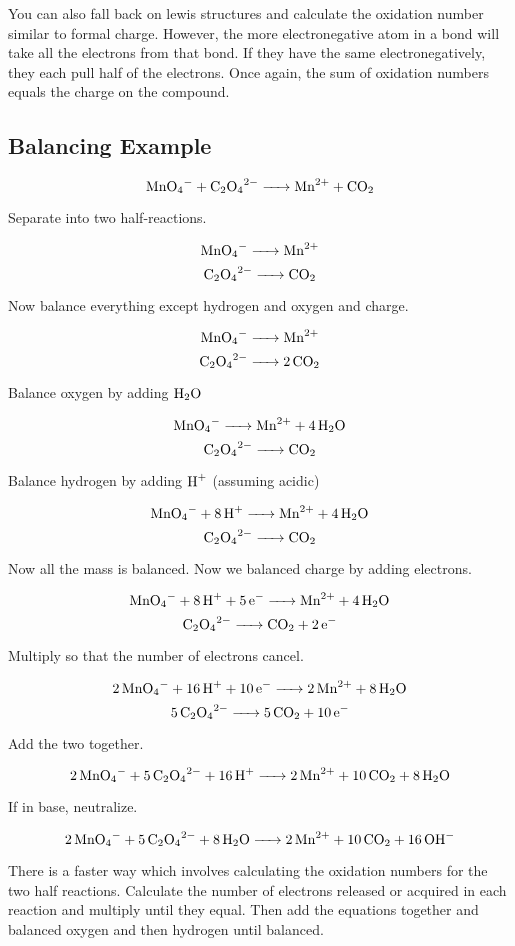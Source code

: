 \documentclass{article}
\begin{document}
You can also fall back on lewis structures and calculate the oxidation number
similar to formal charge. However, the more electronegative atom in a bond will
take all the electrons from that bond. If they have the same electronegatively,
they each pull half of the electrons. Once again, the sum of oxidation numbers
equals the charge on the compound.

\subsection{Balancing Example}

$$\ce{MnO_4^- + C_2O_4^{2-} -> Mn^{2+} + CO_2}$$

Separate into two half-reactions.

$$\ce{MnO_4^- -> Mn^{2+}}$$
$$\ce{C_2O_4^{2-} -> CO_2}$$

Now balance everything except hydrogen and oxygen and charge.

$$\ce{MnO_4^- -> Mn^{2+}}$$
$$\ce{C_2O_4^{2-} -> 2CO_2}$$

Balance oxygen by adding $\ce{H_2O}$

$$\ce{MnO_4^- -> Mn^{2+} + 4H_2O}$$
$$\ce{C_2O_4^{2-} -> CO_2}$$

Balance hydrogen by adding $\ce{H+}$ (assuming acidic)

$$\ce{MnO_4^- + 8H+ -> Mn^{2+} + 4H_2O}$$
$$\ce{C_2O_4^{2-} -> CO_2}$$

Now all the mass is balanced. Now we balanced charge by adding electrons.

$$\ce{MnO_4^- + 8H+ + 5e- -> Mn^{2+} + 4H_2O}$$
$$\ce{C_2O_4^{2-} -> CO_2 + 2e-}$$

Multiply so that the number of electrons cancel.

$$\ce{2MnO_4^- + 16H+ + 10e- -> 2Mn^{2+} + 8H_2O}$$
$$\ce{5C_2O_4^{2-} -> 5CO_2 + 10e-}$$

Add the two together.

$$\ce{2MnO_4^- + 5 C_2O_4^{2-} + 16H+ -> 2Mn^{2+} + 10CO_2 + 8H_2O}$$

If in base, neutralize.

$$\ce{2MnO_4^- + 5 C_2O_4^{2-} + 8H_2O -> 2Mn^{2+} + 10CO_2 + 16OH-}$$

There is a faster way which involves calculating the oxidation numbers for the
two half reactions. Calculate the number of electrons released or acquired in
each reaction and multiply until they equal. Then add the equations together and
balanced oxygen and then hydrogen until balanced.
\end{document}
